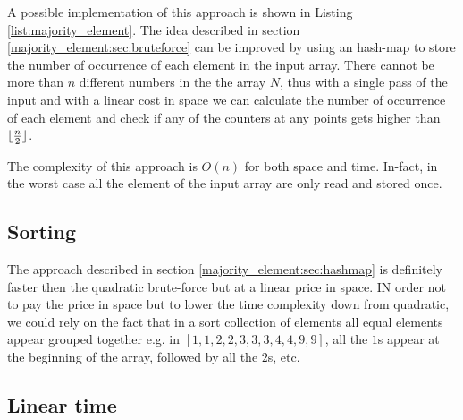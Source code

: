 A possible implementation of this approach is shown in Listing \ref{list:majority_element}.
The idea described in section \ref{majority_element:sec:bruteforce} can be improved by using an hash-map to store the number of occurrence of each element in the input array. There cannot be more than $n$ different numbers in the the array $N$, thus with a single pass of the input and with a linear cost in space we can calculate the number of occurrence of each element and check if any of the counters at any points gets higher than $\lfloor\frac{n}{2}\rfloor$.

The complexity of this approach is $O(n)$ for both space and time. In-fact, in the worst case all the element of the input array are only read and stored once.



\subsection{Sorting}
\label{majority_element:sec:sorting}
The approach described in section \ref{majority_element:sec:hashmap} is definitely faster then the quadratic brute-force but at a linear price in space. IN order not to pay the price in space but to lower the time complexity down from quadratic, we could rely on the fact that in a sort collection of elements all equal elements appear grouped together e.g. in $[1,1,2,2,3,3,3,4,4,9,9]$, all the $1$s appear at the beginning of the array, followed by all the $2$s, etc.




\subsection{Linear time}
\label{majority_element:sec:linear}




